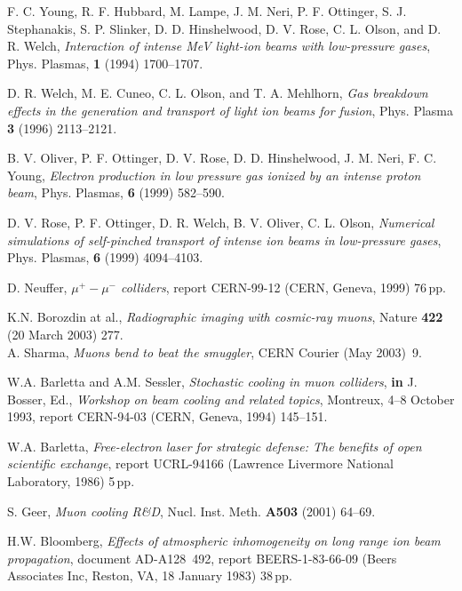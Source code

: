 \documentclass [12pt,a4paper,     ]{report} %
\begin{document}
\begin{enumerate}
  F. C. Young, R. F. Hubbard, M. Lampe, J. M. Neri, P. F. Ottinger, S. J. Stephanakis, S. P. Slinker, D. D. Hinshelwood, D. V. Rose, C. L. Olson, and D. R. Welch, \emph{Interaction of intense MeV light-ion beams with low-pressure gases}, Phys. Plasmas, {\bf 1} (1994) 1700--1707.

  D. R. Welch, M. E. Cuneo, C. L. Olson, and T. A. Mehlhorn, \emph{Gas breakdown effects in the generation and transport of light ion beams for fusion}, Phys. Plasma {\bf 3} (1996) 2113--2121.

  B. V. Oliver, P. F. Ottinger, D. V. Rose, D. D. Hinshelwood, J. M. Neri, F. C. Young, \emph{Electron production in low pressure gas ionized by an intense proton beam}, Phys. Plasmas, {\bf 6} (1999) 582--590.

  D. V. Rose, P. F. Ottinger, D. R. Welch, B. V. Oliver, C. L. Olson, \emph{Numerical simulations of self-pinched transport of intense ion beams in low-pressure gases}, Phys. Plasmas, {\bf 6} (1999) 4094--4103.



 D. Neuffer, \emph{$\mu^+ - \mu^-$ colliders}, report CERN-99-12 (CERN, Geneva, 1999) 76\,pp.

 K.N. Borozdin at al., \emph{Radiographic imaging with cosmic-ray muons}, Nature {\bf 422} (20 March 2003) 277.\\
 A. Sharma, \emph{Muons bend to beat the smuggler}, CERN Courier (May 2003)~9.

 W.A. Barletta and A.M. Sessler, \emph{Stochastic cooling in muon colliders}, {\bf in} J. Bosser, Ed., \emph{Workshop on beam cooling and related topics}, Montreux, 4--8 October 1993, report CERN-94-03 (CERN, Geneva, 1994) 145--151.

 W.A. Barletta, \emph{Free-electron laser for strategic defense: The benefits of open scientific exchange}, report UCRL-94166 (Lawrence Livermore National Laboratory, 1986) 5\,pp.

 S. Geer, \emph{Muon cooling R\&D}, Nucl. Inst. Meth. {\bf A503} (2001) 64--69.




 H.W. Bloomberg, \emph{Effects of atmospheric inhomogeneity on long range ion beam propagation}, document AD-A128~492, report BEERS-1-83-66-09 (Beers Associates Inc, Reston, VA, 18 January 1983) 38\,pp.


\end{enumerate}
\end{document}
